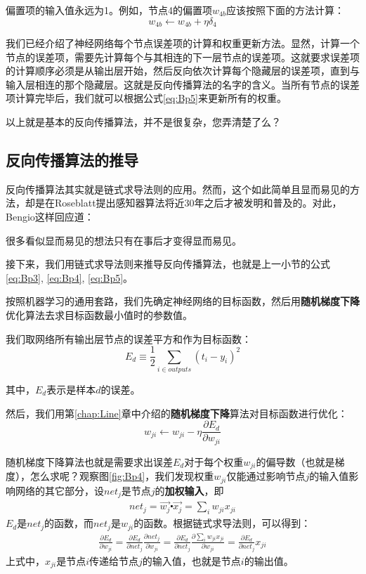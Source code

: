 偏置项的输入值永远为1。例如，节点4的偏置项\(w_{4b}\)应该按照下面的方法计算：
\[
	w_{4b}\gets w_{4b}+\eta\delta_4
\]

我们已经介绍了神经网络每个节点误差项的计算和权重更新方法。显然，计算一个节点的误差项，需要先计算每个与其相连的下一层节点的误差项。这就要求误差项的计算顺序必须是从输出层开始，然后反向依次计算每个隐藏层的误差项，直到与输入层相连的那个隐藏层。这就是反向传播算法的名字的含义。当所有节点的误差项计算完毕后，我们就可以根据公式\ref{eq:Bp5}来更新所有的权重。

以上就是基本的反向传播算法，并不是很复杂，您弄清楚了么？




\subsection{反向传播算法的推导}\label{Bp:7}
反向传播算法其实就是链式求导法则的应用。然而，这个如此简单且显而易见的方法，却是在Roseblatt提出感知器算法将近30年之后才被发明和普及的。对此，Bengio这样回应道：

\begin{note}
	很多看似显而易见的想法只有在事后才变得显而易见。
\end{note}

接下来，我们用链式求导法则来推导反向传播算法，也就是上一小节的公式\ref{eq:Bp3}, \ref{eq:Bp4}, \ref{eq:Bp5}。


按照机器学习的通用套路，我们先确定神经网络的目标函数，然后用\textbf{随机梯度下降}优化算法去求目标函数最小值时的参数值。

我们取网络所有输出层节点的误差平方和作为目标函数：
\[
	E_d\equiv\frac{1}{2}\sum_{i\in outputs}(t_i-y_i)^2
\]

其中，\(E_d\)表示是样本\(d\)的误差。

然后，我们用第\ref{chap:Line}章中介绍的\textbf{随机梯度下降}算法对目标函数进行优化：
\[
	w_{ji}\gets w_{ji}-\eta\frac{\partial{E_d}}{\partial{w_{ji}}}
\]

随机梯度下降算法也就是需要求出误差\(E_d\)对于每个权重\(w_{ji}\)的偏导数（也就是梯度），怎么求呢？观察图\ref{fig:Bp4}，我们发现权重\(w_{ji}\)仅能通过影响节点\(j\)的输入值影响网络的其它部分，设\(net_j\)是节点\(j\)的\textbf{加权输入}，即
\begin{align*}
	net_j=\vec{w_j}\centerdot\vec{x_j} =\sum_{i}{w_{ji}}x_{ji}
\end{align*}
\(E_d\)是\(net_j\)的函数，而\(net_j\)是\(w_{ji}\)的函数。根据链式求导法则，可以得到：
\begin{align*}
	\frac{\partial{E_d}}{\partial{w_{ji}}}=\frac{\partial{E_d}}{\partial{net_j}}\frac{\partial{net_j}}{\partial{w_{ji}}}=\frac{\partial{E_d}}{\partial{net_j}}\frac{\partial{\sum_{i}{w_{ji}}x_{ji}}}{\partial{w_{ji}}}=\frac{\partial{E_d}}{\partial{net_j}}x_{ji}
\end{align*}
上式中，\(x_{ji}\)是节点\(i\)传递给节点\(j\)的输入值，也就是节点\(i\)的输出值。

